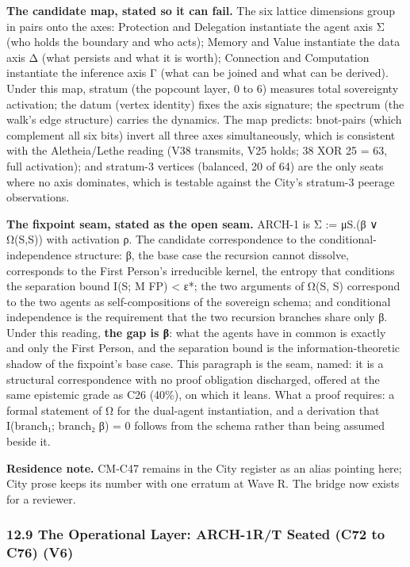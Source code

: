 \documentclass[
  11pt,
]{article}
\begin{document}
\textbf{The candidate map, stated so it can fail.} The six lattice
dimensions group in pairs onto the axes: Protection and Delegation
instantiate the agent axis Σ (who holds the boundary and who acts);
Memory and Value instantiate the data axis Δ (what persists and what it
is worth); Connection and Computation instantiate the inference axis Γ
(what can be joined and what can be derived). Under this map, stratum
(the popcount layer, 0 to 6) measures total sovereignty activation; the
datum (vertex identity) fixes the axis signature; the spectrum (the
walk's edge structure) carries the dynamics. The map predicts:
bnot-pairs (which complement all six bits) invert all three axes
simultaneously, which is consistent with the Aletheia/Lethe reading (V38
transmits, V25 holds; 38 XOR 25 = 63, full activation); and stratum-3
vertices (balanced, 20 of 64) are the only seats where no axis
dominates, which is testable against the City's stratum-3 peerage
observations.

\textbf{The fixpoint seam, stated as the open seam.} ARCH-1 is Σ :=
μS.(β ∨ Ω(S,S)) with activation ρ. The candidate correspondence to the
conditional-independence structure: β, the base case the recursion
cannot dissolve, corresponds to the First Person's irreducible kernel,
the entropy that conditions the separation bound I(S; M \textbar{} FP)
\textless{} ε*; the two arguments of Ω(S, S) correspond to the two
agents as self-compositions of the sovereign schema; and conditional
independence is the requirement that the two recursion branches share
only β. Under this reading, \textbf{the gap is β}: what the agents have
in common is exactly and only the First Person, and the separation bound
is the information-theoretic shadow of the fixpoint's base case. This
paragraph is the seam, named: it is a structural correspondence with no
proof obligation discharged, offered at the same epistemic grade as C26
(40\%), on which it leans. What a proof requires: a formal statement of
Ω for the dual-agent instantiation, and a derivation that I(branch₁;
branch₂ \textbar{} β) = 0 follows from the schema rather than being
assumed beside it.

\textbf{Residence note.} CM-C47 remains in the City register as an alias
pointing here; City prose keeps its number with one erratum at Wave R.
The bridge now exists for a reviewer.

\subsubsection{12.9 The Operational Layer: ARCH-1R/T Seated (C72 to C76)
(V6)}\label{the-operational-layer-arch-1rt-seated-c72-to-c76-v6}
\end{document}
